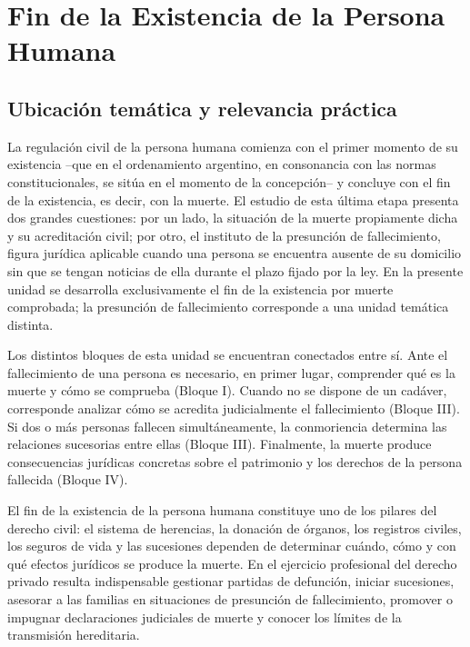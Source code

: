 \documentclass[12pt,oneside]{book}
\begin{document}
\chapter{Fin de la Existencia de la Persona Humana}

\section*{Ubicación temática y relevancia práctica}

La regulación civil de la persona humana comienza con el primer momento de su existencia --que en el ordenamiento argentino, en consonancia con las normas constitucionales, se sitúa en el momento de la concepción-- y concluye con el fin de la existencia, es decir, con la muerte. El estudio de esta última etapa presenta dos grandes cuestiones: por un lado, la situación de la muerte propiamente dicha y su acreditación civil; por otro, el instituto de la presunción de fallecimiento, figura jurídica aplicable cuando una persona se encuentra ausente de su domicilio sin que se tengan noticias de ella durante el plazo fijado por la ley. En la presente unidad se desarrolla exclusivamente el fin de la existencia por muerte comprobada; la presunción de fallecimiento corresponde a una unidad temática distinta.

\begin{note}
Los distintos bloques de esta unidad se encuentran conectados entre sí. Ante el fallecimiento de una persona es necesario, en primer lugar, comprender qué es la muerte y cómo se comprueba (Bloque I). Cuando no se dispone de un cadáver, corresponde analizar cómo se acredita judicialmente el fallecimiento (Bloque III). Si dos o más personas fallecen simultáneamente, la conmoriencia determina las relaciones sucesorias entre ellas (Bloque III). Finalmente, la muerte produce consecuencias jurídicas concretas sobre el patrimonio y los derechos de la persona fallecida (Bloque IV).
\end{note}

El fin de la existencia de la persona humana constituye uno de los pilares del derecho civil: el sistema de herencias, la donación de órganos, los registros civiles, los seguros de vida y las sucesiones dependen de determinar cuándo, cómo y con qué efectos jurídicos se produce la muerte. En el ejercicio profesional del derecho privado resulta indispensable gestionar partidas de defunción, iniciar sucesiones, asesorar a las familias en situaciones de presunción de fallecimiento, promover o impugnar declaraciones judiciales de muerte y conocer los límites de la transmisión hereditaria.
\end{document}

